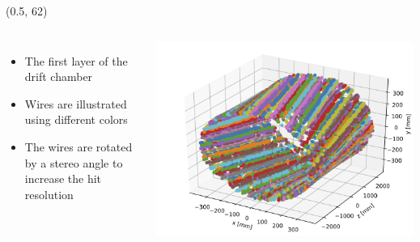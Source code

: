 \documentclass[final,xcolor={dvipsnames,svgnames,x11names,table}]{beamer}
\begin{document}
\begin{frame}
\begin{textblock}{39}
\begin{tcolorbox}[title=Simulation of the IDEA drift chamber within FCCSW]



  \end{tcolorbox}
\end{textblock}

\begin{textblock}{40}(0.5, 62)
  \begin{tcolorbox}[title=The simulation of the drift chamber \& coverage]

  \begin{columns}
      \begin{itemize}
        \item The first layer of the drift chamber
        \item Wires are illustrated using different colors
        \item The wires are rotated by a stereo angle to increase the hit resolution
      \end{itemize}
      \centering
      \includegraphics[width=\textwidth]{Figures/allHits}


\end{columns}
\end{tcolorbox}
\end{textblock}
\end{frame}
\end{document}
